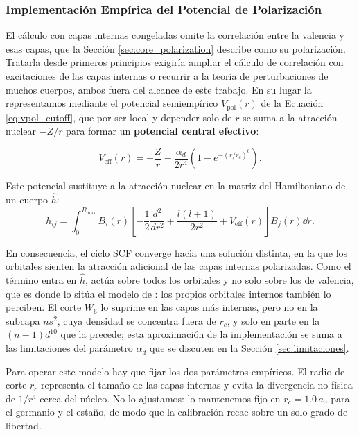 \subsubsection{Implementación Empírica del Potencial de Polarización}
\label{sec:impl_polarizacion}

El cálculo con capas internas congeladas omite la correlación entre la valencia y esas capas, que la Sección \ref{sec:core_polarization} describe como su polarización. Tratarla desde primeros principios exigiría ampliar el cálculo de correlación con excitaciones de las capas internas o recurrir a la teoría de perturbaciones de muchos cuerpos, ambos fuera del alcance de este trabajo. En su lugar la representamos mediante el potencial semiempírico $V_{\text{pol}}(r)$ de la Ecuación \eqref{eq:vpol_cutoff}, que por ser local y depender solo de $r$ se suma a la atracción nuclear $-Z/r$ para formar un \textbf{potencial central efectivo}:

\begin{equation}
    \label{eq:vpol_efectivo}
    V_{\text{eff}}(r) = -\frac{Z}{r} - \frac{\alpha_d}{2 r^4} \left( 1 - e^{-(r/r_c)^6} \right).
\end{equation}

Este potencial sustituye a la atracción nuclear en la matriz del Hamiltoniano de un cuerpo $\hat{h}$:
\begin{equation}
    h_{ij} = \int_0^{R_{\text{max}}} B_i(r) \left[ -\frac{1}{2}\frac{d^2}{dr^2} + \frac{l(l+1)}{2r^2} + V_{\text{eff}}(r) \right] B_j(r) \dd{r}.
\end{equation}

En consecuencia, el ciclo SCF converge hacia una solución distinta, en la que los orbitales sienten la atracción adicional de las capas internas polarizadas. Como el término entra en $\hat{h}$, actúa sobre todos los orbitales y no solo sobre los de valencia, que es donde lo sitúa el modelo de \textcite{Muller1984}: los propios orbitales internos también lo perciben. El corte $W_6$ lo suprime en las capas más internas, pero no en la subcapa $ns^2$, cuya densidad se concentra fuera de $r_c$, y solo en parte en la $(n-1)d^{10}$ que la precede; esta aproximación de la implementación se suma a las limitaciones del parámetro $\alpha_d$ que se discuten en la Sección \ref{sec:limitaciones}.

Para operar este modelo hay que fijar los dos parámetros empíricos. El radio de corte $r_c$ representa el tamaño de las capas internas y evita la divergencia no física de $1/r^4$ cerca del núcleo. No lo ajustamos: lo mantenemos fijo en $r_c = 1.0\,a_0$ para el germanio y el estaño, de modo que la calibración recae sobre un solo grado de libertad.

